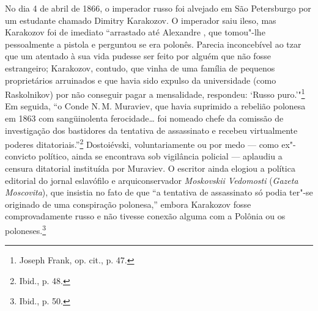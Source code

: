 No dia 4 de abril de 1866, o imperador russo foi alvejado em São
Petersburgo por um estudante chamado Dimitry Karakozov. O imperador saiu
ileso, mas Karakozov foi de imediato ``arrastado até Alexandre , que
tomou"-lhe pessoalmente a pistola e perguntou se era polonês. Parecia
inconcebível ao tzar que um atentado à sua vida pudesse ser feito por
alguém que não fosse estrangeiro; Karakozov, contudo, que vinha de uma
família de pequenos proprietários arruinados e que havia sido expulso da
universidade (como Raskolnikov) por não conseguir pagar a mensalidade,
respondeu: `Russo puro.'"\footnote{Joseph Frank, op. cit., p. 47.} Em
seguida, ``o Conde N.\,M. Muraviev, que havia suprimido a rebelião
polonesa em 1863 com sangüinolenta ferocidade\ldots{} foi nomeado chefe
da comissão de investigação dos bastidores da tentativa de assassinato e
recebeu virtualmente poderes ditatoriais.''\footnote{Ibid., p. 48.}
Dostoiévski, voluntariamente ou por medo --- como ex"-convicto político,
ainda se encontrava sob vigilância policial --- aplaudiu a censura
ditatorial instituída por Muraviev. O escritor ainda elogiou a política
editorial do jornal eslavófilo e arquiconservador \emph{Moskovskii
Vedomosti} (\emph{Gazeta Moscovita}), que insistia no fato de que ``a
tentativa de assassinato só podia ter"-se originado de uma conspiração
polonesa,'' embora Karakozov fosse comprovadamente russo e não tivesse
conexão alguma com a Polônia ou os poloneses.\footnote{Ibid., p. 50.}

